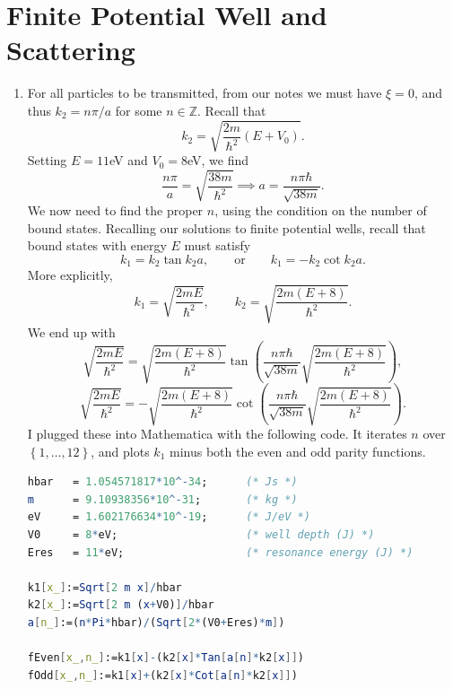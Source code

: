 \documentclass[11pt, letterpaper]{article}
\begin{document}
\section{Finite Potential Well and Scattering}

\begin{enumerate}
	\item For all particles to be transmitted, from our notes we must have $\xi =0$, and thus $k_2=n\pi/a $ for some $n\in\mathbb{Z} $. Recall that
		\[
			k_2=\sqrt{ \frac{2m}{\hbar ^2} (E+V_0)}
		.\]
		Setting $E=11$eV and $V_0=8$eV, we find
		\[
			\frac{n\pi }{a} =\sqrt{\frac{38m}{\hbar ^2} } \implies a=\frac{n\pi \hbar }{\sqrt{38m} } 
		.\]
		We now need to find the proper $n$, using the condition on the number of bound states. Recalling our solutions to finite potential wells, recall that bound states with energy $E$ must satisfy
		\[
			k_1=k_2 \tan k_2a,\qquad \text{or} \qquad k_1=-k_2 \cot k_2a
		.\]
		More explicitly,
		\[
			k_1=\sqrt{\frac{2mE}{\hbar ^2} } ,\qquad k_2=\sqrt{\frac{2m(E+8)}{\hbar ^2} } 
		.\]
		We end up with
		\[
			\sqrt{\frac{2mE}{\hbar ^2} } =\sqrt{\frac{2m(E+8) }{\hbar ^2}} \tan \left( \frac{n\pi \hbar }{\sqrt{38m} } \sqrt{\frac{2m(E+8)}{\hbar ^2} }  \right) ,
		\]
		\[
			\sqrt{\frac{2mE}{\hbar ^2} } =-\sqrt{\frac{2m(E+8)}{\hbar ^2} } \cot \left( \frac{n\pi \hbar }{\sqrt{38m} } \sqrt{\frac{2m(E+8)}{\hbar ^2} }  \right) 
		.\]
		I plugged these into Mathematica with the following code. It iterates $n$ over $\left\{ 1, \ldots , 12 \right\} $, and plots $k_1$ minus both the even and odd parity functions.
		\begin{lstlisting}[language=Mathematica]
hbar   = 1.054571817*10^-34;      (* Js *)
m      = 9.10938356*10^-31;       (* kg *)
eV     = 1.602176634*10^-19;      (* J/eV *)
V0     = 8*eV;                    (* well depth (J) *)
Eres   = 11*eV;                   (* resonance energy (J) *)

k1[x_]:=Sqrt[2 m x]/hbar
k2[x_]:=Sqrt[2 m (x+V0)]/hbar
a[n_]:=(n*Pi*hbar)/(Sqrt[2*(V0+Eres)*m])

fEven[x_,n_]:=k1[x]-(k2[x]*Tan[a[n]*k2[x]])
fOdd[x_,n_]:=k1[x]+(k2[x]*Cot[a[n]*k2[x]])


\end{lstlisting}
\end{enumerate}
\end{document}
